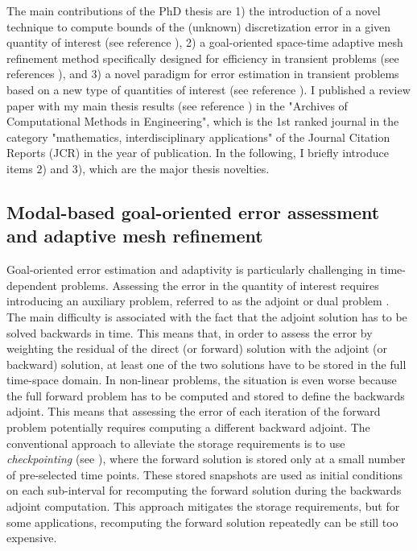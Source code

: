 \documentclass{article}
\newcommand{\bemph}[1]{#1}
\begin{document}
The main contributions of the PhD thesis are 1) the introduction of a novel technique to compute bounds of the (unknown) discretization error in a given quantity of interest (see reference \cite{verdugo_computable_2012}), 2) a goal-oriented space-time adaptive mesh refinement method specifically designed for efficiency in transient problems (see references \cite{casadei_algorithm_2013,VerdugoParesDiez2014a}), and 3)  a novel paradigm for error estimation in transient problems based on a new type of quantities of interest (see reference \cite{Verdugo2013}). I published a review paper with my main thesis results (see reference \cite{verdugo_error_2014}) in the "Archives of Computational Methods in Engineering", which is the \bemph{1st ranked journal} in the category "mathematics, interdisciplinary applications" of the Journal Citation Reports (JCR) in the year of publication. In the following, I briefly introduce items 2) and 3), which are the major thesis novelties.

\subsection{Modal-based goal-oriented error assessment and adaptive mesh refinement}

Goal-oriented error estimation and adaptivity is particularly challenging in time-dependent problems. Assessing the error in the quantity of interest requires introducing an auxiliary problem, referred to as the adjoint or dual problem \cite{becker_optimal_2001}. The main difficulty is associated with the fact that the adjoint solution has to be solved backwards in time. This means that, in order to assess the error by weighting the residual of the direct (or forward) solution with the adjoint (or backward) solution, at least one of the two solutions have to be stored in the full time-space domain. In non-linear problems, the situation is even worse because the full forward problem has to be computed and stored to define the backwards adjoint. This means that assessing the error of each iteration of the forward problem potentially requires computing a different backward adjoint. The conventional approach to alleviate the storage requirements is to use \emph{checkpointing} (see \cite{Griewank2000}), where the forward solution is stored only at a small number of pre-selected time points. These stored snapshots are used  as initial conditions on each sub-interval for recomputing the forward solution during the backwards adjoint computation. This approach mitigates the storage requirements, but for some applications, recomputing the forward solution repeatedly can be still too expensive.
\end{document}
